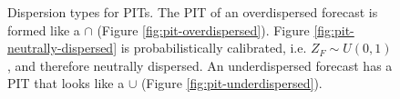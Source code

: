 \begin{figure}[h]%
    \centering
    \caption[Dispersion types for PITs]{Dispersion types for PITs. The PIT of an overdispersed forecast is formed like a \(\cap\) (Figure \ref{fig:pit-overdispersed}). 
    Figure \ref{fig:pit-neutrally-dispersed} is probabilistically calibrated, i.e. \(Z_F \sim U(0,1)\), and therefore neutrally dispersed. 
    An underdispersed forecast has a PIT that looks like a \(\cup\) (Figure \ref{fig:pit-underdispersed}).}%
    \label{fig:dispersion}%
\end{figure}

